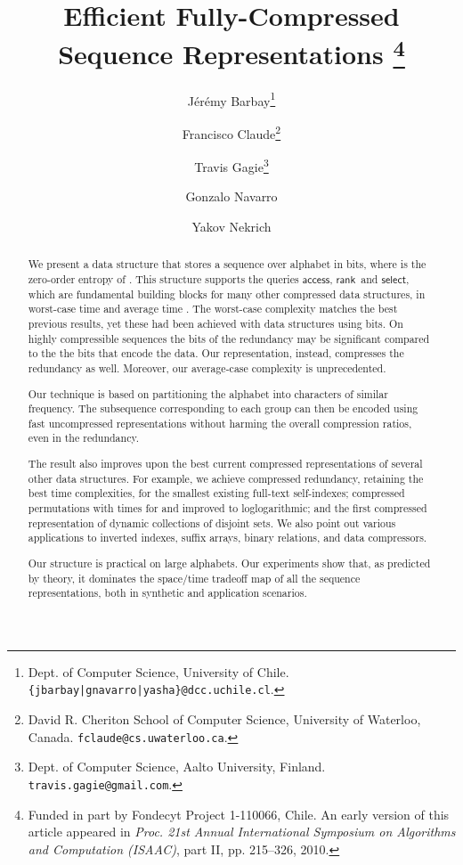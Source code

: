 \documentclass[11pt]{article}
\newcommand{\access}
    {\ensuremath{\mathsf{access}}}
\newcommand{\rank}
    {\ensuremath{\mathsf{rank}}}
\newcommand{\select}
    {\ensuremath{\mathsf{select}}}
\begin{document}
\title{Efficient Fully-Compressed Sequence Representations
\thanks{Funded in part by Fondecyt Project 1-110066, Chile.
An early version of this article appeared in {\em Proc. 21st Annual 
International Symposium on Algorithms and Computation (ISAAC)}, part II,
pp. 215--326, 2010.}
}

\author{J\'{e}r\'{e}my Barbay\thanks{Dept. of Computer Science, 
        University of Chile. {\tt \{jbarbay|gnavarro|yasha\}@dcc.uchile.cl}.}
\and
    Francisco Claude\thanks{David R. Cheriton School of Computer Science,
University of Waterloo, Canada. {\tt fclaude@cs.uwaterloo.ca}.}
\and
    Travis Gagie\thanks{Dept. of Computer Science, Aalto University, Finland. 
    {\tt travis.gagie@gmail.com}.}
\and
    Gonzalo Navarro
\and
    Yakov Nekrich
}

\date{}
\maketitle

\setcounter{footnote}{0}

\begin{abstract}
  We present a data structure that stores a sequence  over
  alphabet  in  bits, where
   is the zero-order entropy of .
This structure supports the queries \access, \rank\ and \select,
  which are fundamental building blocks for many other compressed data 
  structures, in worst-case time 
  and average time .
The worst-case complexity matches the best previous results, yet these had
  been achieved with data structures using  bits. 
  On highly compressible sequences the  bits of the redundancy 
  may be significant compared to the the  bits that encode the data. 
  Our representation, instead, compresses the redundancy as well. Moreover, our 
  average-case complexity is unprecedented.
  
  Our technique is based on partitioning the alphabet into characters of 
  similar frequency. The subsequence corresponding to each group can then be 
  encoded using fast uncompressed representations without harming the overall
  compression ratios, even in the redundancy.
  
  The result also improves upon the best current compressed
  representations of several other data structures.
For example, we achieve
   compressed redundancy, retaining the best time complexities, for the 
  smallest existing full-text self-indexes; 
   compressed permutations  with times for  and 
   improved to loglogarithmic; and 
   the first compressed representation of dynamic collections of 
  disjoint sets.
We also point out various applications to inverted indexes,
  suffix arrays, binary relations, and data compressors.

  Our structure is practical on large alphabets. Our experiments show that,
  as predicted by theory, it dominates the space/time tradeoff map
  of all the sequence representations, both in synthetic and application
  scenarios.
\end{abstract}
\end{document}
